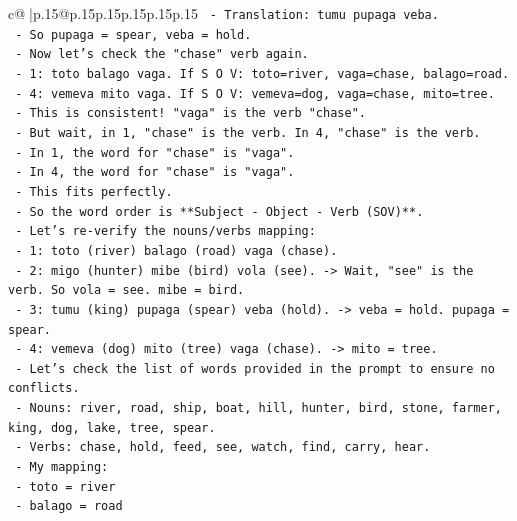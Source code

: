 \documentclass{article}
\begin{document}
{\begin{supertabular}{c@{$\;$}|p{.15\linewidth}@{}p{.15\linewidth}p{.15\linewidth}p{.15\linewidth}p{.15\linewidth}p{.15\linewidth}}
{{{\texttt{              {-} Translation: tumu pupaga veba.} \\
\texttt{              {-} So pupaga = spear, veba = hold.} \\
\texttt{            {-} Now let's check the "chase" verb again.} \\
\texttt{              {-} 1: toto balago vaga. If S O V: toto=river, vaga=chase, balago=road.} \\
\texttt{              {-} 4: vemeva mito vaga. If S O V: vemeva=dog, vaga=chase, mito=tree.} \\
\texttt{              {-} This is consistent! "vaga" is the verb "chase".} \\
\texttt{              {-} But wait, in 1, "chase" is the verb. In 4, "chase" is the verb.} \\
\texttt{              {-} In 1, the word for "chase" is "vaga".} \\
\texttt{              {-} In 4, the word for "chase" is "vaga".} \\
\texttt{              {-} This fits perfectly.} \\
\texttt{              {-} So the word order is **Subject {-} Object {-} Verb (SOV)**.} \\
\texttt{              {-} Let's re{-}verify the nouns/verbs mapping:} \\
\texttt{                {-} 1: toto (river) balago (road) vaga (chase).} \\
\texttt{                {-} 2: migo (hunter) mibe (bird) vola (see). {-}> Wait, "see" is the verb. So vola = see. mibe = bird.} \\
\texttt{                {-} 3: tumu (king) pupaga (spear) veba (hold). {-}> veba = hold. pupaga = spear.} \\
\texttt{                {-} 4: vemeva (dog) mito (tree) vaga (chase). {-}> mito = tree.} \\
\texttt{              {-} Let's check the list of words provided in the prompt to ensure no conflicts.} \\
\texttt{                {-} Nouns: river, road, ship, boat, hill, hunter, bird, stone, farmer, king, dog, lake, tree, spear.} \\
\texttt{                {-} Verbs: chase, hold, feed, see, watch, find, carry, hear.} \\
\texttt{                {-} My mapping:} \\
\texttt{                  {-} toto = river} \\
\texttt{                  {-} balago = road} \\
}}}
\end{supertabular}}
\end{document}
